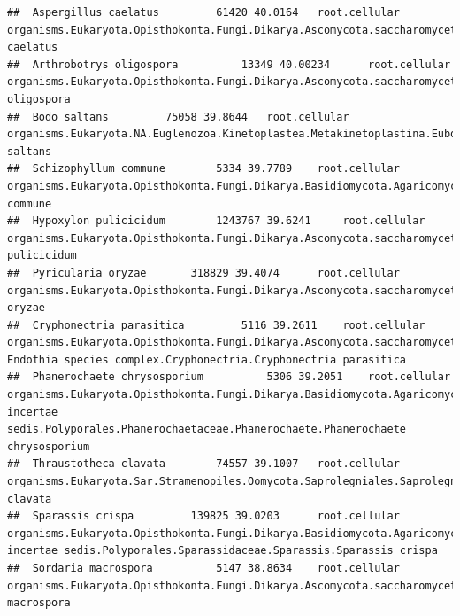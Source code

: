 \documentclass{article}\usepackage[]{graphicx}\usepackage[]{color}
\makeatletter
\newenvironment{kframe}{%
 \def\at@end@of@kframe{}%
 \ifinner\ifhmode%
  \def\at@end@of@kframe{\end{minipage}}%
  \begin{minipage}{\columnwidth}%
 \fi\fi%
 \def\FrameCommand##1{\hskip\@totalleftmargin \hskip-\fboxsep
 \colorbox{shadecolor}{##1}\hskip-\fboxsep
     \hskip-\linewidth \hskip-\@totalleftmargin \hskip\columnwidth}%
 \MakeFramed {\advance\hsize-\width
   \@totalleftmargin\z@ \linewidth\hsize
   \@setminipage}}%
 {\par\unskip\endMakeFramed%
 \at@end@of@kframe}
\newenvironment{knitrout}{}{} %
\makeatother
\begin{document}
\begin{knitrout}
\begin{kframe}
\begin{verbatim}
##  Aspergillus caelatus 		 61420 40.0164 	 root.cellular organisms.Eukaryota.Opisthokonta.Fungi.Dikarya.Ascomycota.saccharomyceta.Pezizomycotina.leotiomyceta.Eurotiomycetes.Eurotiomycetidae.Eurotiales.Aspergillaceae.Aspergillus.Aspergillus caelatus
##  Arthrobotrys oligospora 		 13349 40.00234 	 root.cellular organisms.Eukaryota.Opisthokonta.Fungi.Dikarya.Ascomycota.saccharomyceta.Pezizomycotina.Orbiliomycetes.Orbiliales.Orbiliaceae.Arthrobotrys.Arthrobotrys oligospora
##  Bodo saltans 		 75058 39.8644 	 root.cellular organisms.Eukaryota.NA.Euglenozoa.Kinetoplastea.Metakinetoplastina.Eubodonida.Bodonidae.Bodo.Bodo saltans
##  Schizophyllum commune 		 5334 39.7789 	 root.cellular organisms.Eukaryota.Opisthokonta.Fungi.Dikarya.Basidiomycota.Agaricomycotina.Agaricomycetes.Agaricomycetidae.Agaricales.Schizophyllaceae.Schizophyllum.Schizophyllum commune
##  Hypoxylon pulicicidum 		 1243767 39.6241 	 root.cellular organisms.Eukaryota.Opisthokonta.Fungi.Dikarya.Ascomycota.saccharomyceta.Pezizomycotina.leotiomyceta.sordariomyceta.Sordariomycetes.Xylariomycetidae.Xylariales.NA.Hypoxylon.Hypoxylon pulicicidum
##  Pyricularia oryzae 		 318829 39.4074 	 root.cellular organisms.Eukaryota.Opisthokonta.Fungi.Dikarya.Ascomycota.saccharomyceta.Pezizomycotina.leotiomyceta.sordariomyceta.Sordariomycetes.Sordariomycetidae.NA.Pyriculariaceae.Pyricularia.Pyricularia oryzae
##  Cryphonectria parasitica 		 5116 39.2611 	 root.cellular organisms.Eukaryota.Opisthokonta.Fungi.Dikarya.Ascomycota.saccharomyceta.Pezizomycotina.leotiomyceta.sordariomyceta.Sordariomycetes.Sordariomycetidae.Diaporthales.Cryphonectriaceae.Cryphonectria-Endothia species complex.Cryphonectria.Cryphonectria parasitica
##  Phanerochaete chrysosporium 		 5306 39.2051 	 root.cellular organisms.Eukaryota.Opisthokonta.Fungi.Dikarya.Basidiomycota.Agaricomycotina.Agaricomycetes.Agaricomycetes incertae sedis.Polyporales.Phanerochaetaceae.Phanerochaete.Phanerochaete chrysosporium
##  Thraustotheca clavata 		 74557 39.1007 	 root.cellular organisms.Eukaryota.Sar.Stramenopiles.Oomycota.Saprolegniales.Saprolegniaceae.Thraustotheca.Thraustotheca clavata
##  Sparassis crispa 		 139825 39.0203 	 root.cellular organisms.Eukaryota.Opisthokonta.Fungi.Dikarya.Basidiomycota.Agaricomycotina.Agaricomycetes.Agaricomycetes incertae sedis.Polyporales.Sparassidaceae.Sparassis.Sparassis crispa
##  Sordaria macrospora 		 5147 38.8634 	 root.cellular organisms.Eukaryota.Opisthokonta.Fungi.Dikarya.Ascomycota.saccharomyceta.Pezizomycotina.leotiomyceta.sordariomyceta.Sordariomycetes.Sordariomycetidae.Sordariales.Sordariaceae.Sordaria.Sordaria macrospora

\end{verbatim}
\end{kframe}
\end{knitrout}
\end{document}
